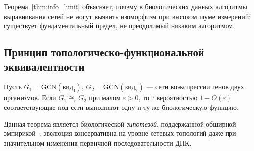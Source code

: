 \begin{remark}
Теорема~\ref{thm:info_limit} объясняет, почему в биологических данных
алгоритмы выравнивания сетей не могут выявить изоморфизм при высоком
шуме измерений: существует фундаментальный предел, не преодолимый
никаким алгоритмом.
\end{remark}

\subsection{Принцип топологическо-функциональной эквивалентности}

\begin{theorem}
\label{thm:conservation}
Пусть $G_1 = \mathrm{GCN}(\text{вид}_1)$, $G_2 = \mathrm{GCN}(\text{вид}_2)$ —
сети коэкспрессии генов двух организмов.
Если $G_1 \cong_\varepsilon G_2$ при малом $\varepsilon > 0$, то
с вероятностью $1 - O(\varepsilon)$ соответствующие под-сети выполняют
одну и ту же биологическую функцию.
\end{theorem}

Данная теорема является биологической \emph{гипотезой}, поддержанной
обширной эмпирикой~\cite{graal2010,wgcna2008}:
эволюция консервативна на уровне сетевых топологий даже при значительном
изменении первичной последовательности ДНК.
